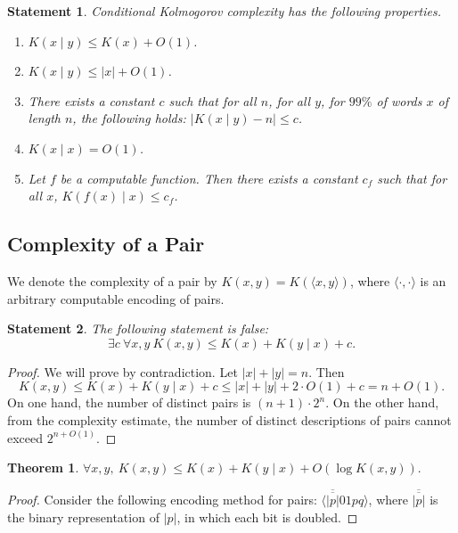 \documentclass[12pt,sans]{article}
\theoremstyle{definition}
\theoremstyle{plain}
\newtheorem{theorem}{Theorem}[section]
\newtheorem{statement}{Statement}[section]
\theoremstyle{remark}
\begin{document}
\begin{statement}
    Conditional Kolmogorov complexity has the following properties.
    \begin{enumerate}
        \item $K(x \mid y) \le K(x) + O(1)$.
        \item $K(x \mid y) \le |x| + O(1)$.
        \item There exists a constant $c$ such that for all $n$, for all $y$, for $99\%$ of words $x$ of length $n$, the following holds: \(|K(x \mid y) - n| \le c\).
        \item $K(x \mid x) = O(1)$.
        \item Let $f$ be a computable function. Then there exists a constant $c_f$ such that for all $x$, $K(f(x) \mid x) \le c_f$.
    \end{enumerate}
\end{statement}

\subsection{Complexity of a Pair}
We denote the complexity of a pair by $K(x,y) = K(\langle x,y\rangle)$, where $\langle\cdot,\cdot\rangle$ is an arbitrary computable encoding of pairs.

\begin{statement}
    The following statement is \emph{false}:
    \[
    \exists c\ \forall x,y\ K(x,y) \le K(x) + K(y \mid x) + c.
    \]
\end{statement}

\begin{proof}
    We will prove by contradiction. Let $|x| + |y| = n$. Then
    \[
    K(x,y) \le K(x) + K(y \mid x) + c \le |x| + |y| + 2 \cdot O(1) + c = n + O(1).
    \]
    On one hand, the number of distinct pairs is $(n+1) \cdot 2^n$. On the other hand, from the complexity estimate, the number of distinct descriptions of pairs cannot exceed $2^{n + O(1)}$.
\end{proof}

\begin{theorem}
    \(
    \forall x,y,\ K(x,y) \le K(x) + K(y \mid x) + O(\log K(x,y)).
    \)
\end{theorem}

\begin{proof}
    Consider the following encoding method for pairs: $\langle \overline{\overline{|p|}}01pq\rangle$, where $\overline{\overline{|p|}}$ is the binary representation of $|p|$, in which each bit is doubled.
\end{proof}
\end{document}
